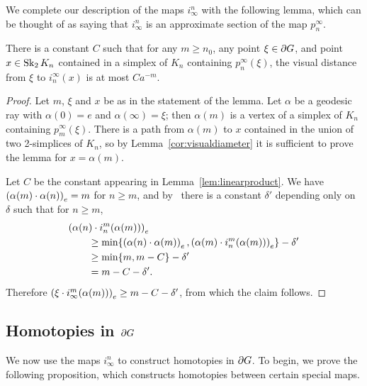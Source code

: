 \documentclass[a4paper]{article}
\begin{document}
We complete our description of the maps $i^n_\infty$ with the following lemma,
which can be thought of as saying that $i^n_\infty$ is an approximate section
of the map $p^\infty_n$.

\begin{lemma}\label{lem:convergestoidentity}
  There is a constant $C$ such that for any $m \geq n_0$, any point $\xi \in
  \boundary G$, and point $x \in \Skel_2 K_n$ contained in a simplex
  of $K_n$ containing $p^\infty_n(\xi)$, the visual distance from $\xi$ to
  $i^\infty_n(x)$ is at most $Ca^{-m}$.
\end{lemma}

\begin{proof}
  Let $m$, $\xi$ and $x$ be as in the statement of the lemma.
  Let $\alpha$ be a geodesic ray with $\alpha(0) = e$ and $\alpha(\infty) =
  \xi$; then $\alpha(m)$ is a vertex of a simplex of $K_n$ containing
  $p^\infty_m(\xi)$. There is a path from $\alpha(m)$ to $x$ contained in the
  union of two 2-simplices of $K_n$, so by Lemma~\ref{cor:visualdiameter} it is
  sufficient to prove the lemma for $x = \alpha(m)$.

  Let $C$ be the constant appearing in Lemma~\ref{lem:linearproduct}.
  We have $\gromov{e}{\alpha(m)}{\alpha(n)} = m$ for $n\geq m$, and
  by~\cite[Proposition III.H.1.22]{bridsonhaefliger99} there is a constant
  $\delta'$ depending only on $\delta$ such that for $n\geq m$,
  \begin{align*}
    \mathrlap{\gromov{e}{\alpha(n)}{i^m_n(\alpha(m))}}\quad\quad &\\
          & \geq \min\{\gromov{e}{\alpha(n)}{\alpha(m)}, 
            \gromov{e}{\alpha(m)}{i^m_n(\alpha(m))}\} 
            - \delta' \\
          &\geq \min\{m, m - C\} - \delta' \\
          &=  m - C - \delta'.
  \end{align*}
  Therefore $\gromov{e}{\xi}{i^m_\infty(\alpha(m))} \geq m - C - \delta'$, 
  from which the claim follows.
\end{proof}

\subsection{Homotopies in $\boundary G$}

We now use the maps $i^n_\infty$ to construct homotopies in $\boundary G$. To
begin, we prove the following proposition, which constructs homotopies between
certain special maps.
\end{document}
